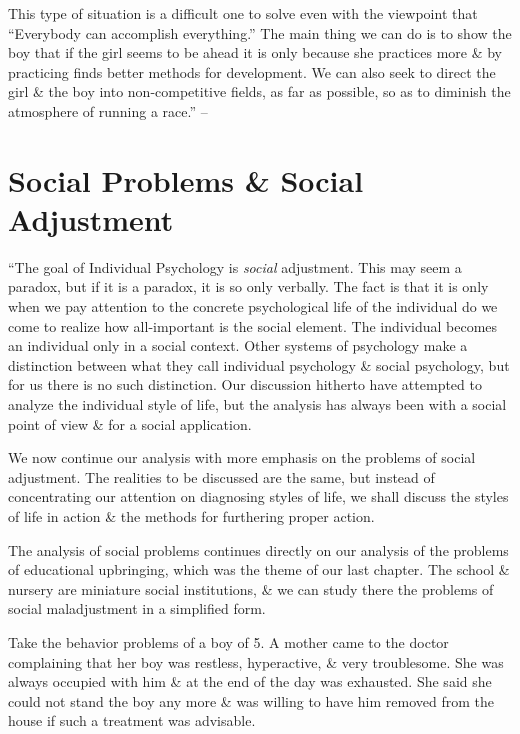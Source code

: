 \documentclass{article}
\begin{document}
This type of situation is a difficult one to solve even with the viewpoint that ``Everybody can accomplish everything.'' The main thing we can do is to show the boy that if the girl seems to be ahead it is only because she practices more \& by practicing finds better methods for development. We can also seek to direct the girl \& the boy into non-competitive fields, as far as possible, so as to diminish the atmosphere of running a race.'' -- \cite[pp. 173--198]{Adler_science_living}


\section{Social Problems \& Social Adjustment}
``The goal of Individual Psychology is \textit{social} adjustment. This may seem a paradox, but if it is a paradox, it is so only verbally. The fact is that it is only when we pay attention to the concrete psychological life of the individual do we come to realize how all-important is the social element. The individual becomes an individual only in a social context. Other systems of psychology make a distinction between what they call individual psychology \& social psychology, but for us there is no such distinction. Our discussion hitherto have attempted to analyze the individual style of life, but the analysis has always been with a social point of view \& for a social application.

We now continue our analysis with more emphasis on the problems of social adjustment. The realities to be discussed are the same, but instead of concentrating our attention on diagnosing styles of life, we shall discuss the styles of life in action \& the methods for furthering proper action.

The analysis of social problems continues directly on our analysis of the problems of educational upbringing, which was the theme of our last chapter. The school \& nursery are miniature social institutions, \& we can study there the problems of social maladjustment in a simplified form.

Take the behavior problems of a boy of 5. A mother came to the doctor complaining that her boy was restless, hyperactive, \& very troublesome. She was always occupied with him \& at the end of the day was exhausted. She said she could not stand the boy any more \& was willing to have him removed from the house if such a treatment was advisable.
\end{document}
